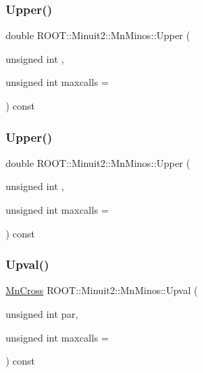 \subsubsection{\texorpdfstring{Upper()}{Upper()}\hspace{0.1cm}{\footnotesize\ttfamily [2/3]}}
{\footnotesize\ttfamily double R\+O\+O\+T\+::\+Minuit2\+::\+Mn\+Minos\+::\+Upper (\begin{DoxyParamCaption}\item[{unsigned int}]{,  }\item[{unsigned int}]{maxcalls = {} }\end{DoxyParamCaption}) const}

\mbox{\label{classROOT_1_1Minuit2_1_1MnMinos_a387b76e3135998c519db7e6ae4cc3d90}} 
\subsubsection{\texorpdfstring{Upper()}{Upper()}\hspace{0.1cm}{\footnotesize\ttfamily [3/3]}}
{\footnotesize\ttfamily double R\+O\+O\+T\+::\+Minuit2\+::\+Mn\+Minos\+::\+Upper (\begin{DoxyParamCaption}\item[{unsigned int}]{,  }\item[{unsigned int}]{maxcalls = {} }\end{DoxyParamCaption}) const}

\mbox{\label{classROOT_1_1Minuit2_1_1MnMinos_a6fb073e7f84cb2d038714e362eda732a}} 
\subsubsection{\texorpdfstring{Upval()}{Upval()}\hspace{0.1cm}{\footnotesize\ttfamily [1/3]}}
{\footnotesize\ttfamily \mbox{\hyperlink{classROOT_1_1Minuit2_1_1MnCross}{Mn\+Cross}} R\+O\+O\+T\+::\+Minuit2\+::\+Mn\+Minos\+::\+Upval (\begin{DoxyParamCaption}\item[{unsigned int}]{par,  }\item[{unsigned int}]{maxcalls = {} }\end{DoxyParamCaption}) const}

